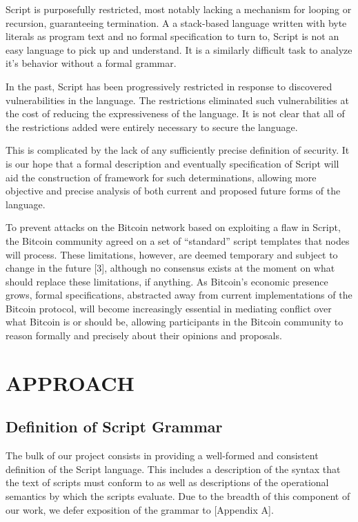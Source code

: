 \documentclass[letterpaper, 10 pt, conference]{ieeeconf}
\begin{document}
Script is purposefully restricted, most notably lacking a mechanism for looping or recursion, guaranteeing termination. A a stack-based language written with byte literals as program text and no formal specification to turn to, Script is not an easy language to pick up and understand. It is a similarly difficult task to analyze it's behavior without a formal grammar.

In the past, Script has been progressively restricted in response to discovered vulnerabilities in the language. The restrictions eliminated such vulnerabilities at the cost of reducing the expressiveness of the language. It is not clear that all of the restrictions added were entirely necessary to secure the language.

This is complicated by the lack of any sufficiently precise definition of security. It is our hope that a formal description and eventually specification of Script will aid the construction of framework for such determinations, allowing more objective and precise analysis of both current and proposed future forms of the language.

To prevent attacks on the Bitcoin network based on exploiting a flaw in Script, the Bitcoin community agreed on a set of ``standard'' script templates that nodes will process. These limitations, however, are deemed temporary and subject to change in the future [3], although no consensus exists at the moment on what should replace these limitations, if anything. As Bitcoin's economic presence grows, formal specifications, abstracted away from current implementations of the Bitcoin protocol, will become increasingly essential in mediating conflict over what Bitcoin is or should be, allowing participants in the Bitcoin community to reason formally and precisely about their opinions and proposals.

\section{APPROACH}

\subsection{Definition of Script Grammar}
The bulk of our project consists in providing a well-formed and consistent definition of the Script language. This includes a description of the syntax that the text of scripts must conform to as well as descriptions of the operational semantics by which the scripts evaluate. Due to the breadth of this component of our work, we defer exposition of the grammar to [Appendix A].
\end{document}

